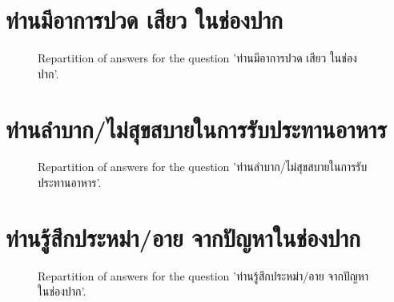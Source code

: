 \documentclass[12pt]{article}
\begin{document}
\clearpage{}
\section{ท่านมีอาการปวด เสียว ในช่องปาก}

\label{sec:132}


\begin{figure}[h!]
    \caption{\label{figure:q132-1}Repartition of answers for the question 'ท่านมีอาการปวด เสียว ในช่องปาก'.}
\end{figure}



\clearpage{}
\section{ท่านลำบาก/ไม่สุขสบายในการรับประทานอาหาร}

\label{sec:133}


\begin{figure}[h!]
    \caption{\label{figure:q133-1}Repartition of answers for the question 'ท่านลำบาก/ไม่สุขสบายในการรับประทานอาหาร'.}
\end{figure}



\clearpage{}
\section{ท่านรู้สึกประหม่า/อาย จากปัญหาในช่องปาก}

\label{sec:134}


\begin{figure}[h!]
    \caption{\label{figure:q134-1}Repartition of answers for the question 'ท่านรู้สึกประหม่า/อาย จากปัญหาในช่องปาก'.}
\end{figure}
\end{document}
